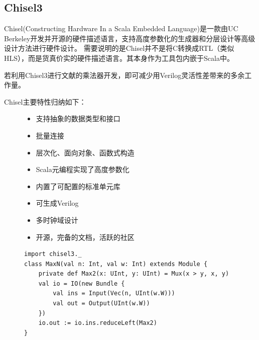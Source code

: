     \subsection{Chisel3}
        Chisel(Constructing Hardware In a Scala Embedded Language)是一款由UC Berkeley开发并开源的硬件描述语言，支持高度参数化的生成器和分层设计等高级设计方法进行硬件设计。
        需要说明的是Chisel并不是将C转换成RTL（类似HLS），而是货真价实的硬件描述语言。其本身作为工具包内嵌于Scala中。

        若利用Chisel3进行文献\cite{deng2018wallace}的乘法器开发，即可减少用Verilog灵活性差带来的多余工作量。

        Chisel主要特性归纳如下：
        \begin{figure}[h]
            \begin{itemize}[topsep = 0 pt]
                \setlength{\topsep}{0pt}
                \setlength{\itemsep}{0pt}
                \setlength{\parsep}{0pt}
                \setlength{\parskip}{0pt}
                \setlength{\partopsep}{0pt}
                \item 支持抽象的数据类型和接口
                \item 批量连接
                \item 层次化、面向对象、函数式构造
                \item Scala元编程实现了高度参数化
                \item 内置了可配置的标准单元库
                \item 可生成Verilog
                \item 多时钟域设计
                \item 开源，完备的文档，活跃的社区
            \end{itemize}
        \end{figure}
        \begin{figure}[h]
            \label{chisel_example}
            \begin{lstlisting}[title=Chisel Example, frame=shadowbox]
import chisel3._
class MaxN(val n: Int, val w: Int) extends Module {
    private def Max2(x: UInt, y: UInt) = Mux(x > y, x, y)
    val io = IO(new Bundle {
        val ins = Input(Vec(n, UInt(w.W)))
        val out = Output(UInt(w.W))
    })
    io.out := io.ins.reduceLeft(Max2)
}
            \end{lstlisting}
        \end{figure}

